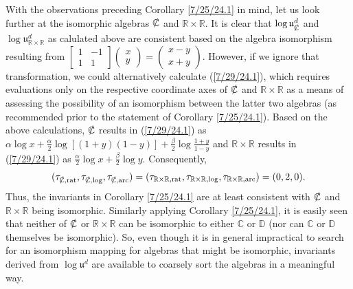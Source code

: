 \documentclass{amsart}
\numberwithin{equation}{section}
\theoremstyle{definition}
\numberwithin{theorem}{section}
\begin{document}
With the observations preceding Corollary \ref{7/25/24.1} in mind, let us look further at the isomorphic algebras $\slashed{\mathbb{C}}$ and $\mathbb{R}\times\mathbb{R}$.  It is clear that $\log\mathfrak{u}^d_{\slashed{\mathbb{C}}}$ and $\log\mathfrak{u}^d_{\mathbb{R}\times\mathbb{R}}$ as calulated above are consistent based on the algebra isomorphism resulting from $\left[\begin{array}{ccc}
 1 & -1   \\ 
 1 & 1    
\end{array}\right]\left(\begin{array}{ccc}
x   \\ 
y   
\end{array}\right) = \left(\begin{array}{ccc}
x-y   \\ 
x+y   
\end{array}\right)$.  However, if we ignore that transformation, we could alternatively calculate (\ref{7/29/24.1}), which requires evaluations only on the respective coordinate axes of $\slashed{\mathbb{C}}$ and $\mathbb{R}\times\mathbb{R}$ as a means of assessing the possibility of an isomorphism between the latter two algebras (as recommended prior to the statement of Corollary \ref{7/25/24.1}).  Based on the above calculations, $\slashed{\mathbb{C}}$ results in (\ref{7/29/24.1}) as $\alpha\log x+ \frac{\alpha}{2}\log[(1+
y)(1-y)] +  \frac{\beta}{2}\log \frac{1+y}{1-y}$ and $\mathbb{R}\times\mathbb{R}$ results in (\ref{7/29/24.1}) as $\frac{\alpha}{2}\log x +\frac{\beta}{2} \log y$. Consequently,  \[(\tau_{\slashed{\mathbb{C}},{\rm rat}},\tau_{\slashed{\mathbb{C}},{\rm log}},\tau_{\slashed{\mathbb{C}},{\rm arc}}) = (\tau_{\mathbb{R}\times\mathbb{R},{\rm rat}},\tau_{\mathbb{R}\times\mathbb{R},{\rm log}},\tau_{\mathbb{R}\times\mathbb{R},{\rm arc}}) = (0,2,0). \] Thus, the invariants in Corollary \ref{7/25/24.1} are at least consistent with $\slashed{\mathbb{C}}$ and $\mathbb{R}\times\mathbb{R}$ being isomorphic.  Similarly applying Corollary \ref{7/25/24.1}, it is easily seen that neither of $\slashed{\mathbb{C}}$ or $\mathbb{R}\times\mathbb{R}$ can be isomorphic to either $\mathbb{C}$ or $\mathbb{D}$ (nor can  $\mathbb{C}$ or $\mathbb{D}$ themselves be isomorphic).   So, even though it is in general impractical to search for an isomorphism mapping for algebras that might be isomorphic, invariants derived from $\log\mathfrak{u}^d$ are available to coarsely sort the algebras in a meaningful way.
\end{document}
